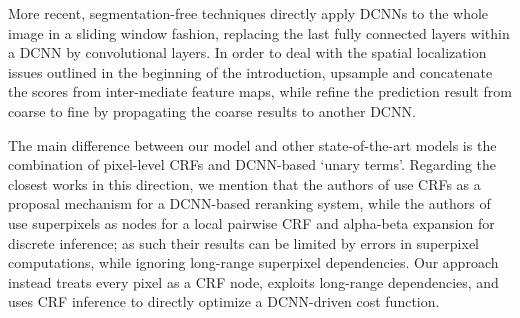 
More recent, segmentation-free techniques \citet{long2014fully, eigen2014predicting} directly apply DCNNs to the whole image in a sliding window fashion, replacing the last fully connected layers within a DCNN  by convolutional layers. In order to deal with the spatial localization issues outlined in the beginning of the introduction, \citet{long2014fully} upsample and concatenate the scores from inter-mediate feature maps, while \citet{eigen2014predicting} refine the prediction result from coarse to fine by propagating the coarse results to another DCNN. 


The main difference between our model and other state-of-the-art models is the combination of pixel-level CRFs and DCNN-based `unary terms'. Regarding the closest    works in this direction, we mention that  the authors of \citet{cogswell2014combining} use CRFs as a proposal mechanism for a DCNN-based reranking system, while the authors of  
\citet{farabet2013learning} use superpixels as  nodes for a local pairwise CRF and alpha-beta expansion for discrete inference; as such their results can be limited by errors in superpixel computations, while ignoring  long-range superpixel dependencies. Our approach instead treats every pixel as a CRF node, exploits long-range dependencies, and uses  CRF inference to directly optimize a DCNN-driven cost function. 









